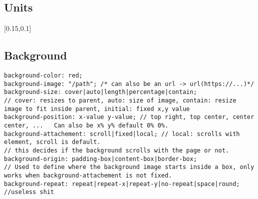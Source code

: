 \documentclass[main.tex,fontsize=6pt,paper=a4,paper=landscape,DIV=calc,]{scrartcl}
\begin{document}
\begin{multicols*}{4}
\subsection{Units}
[0.15,0.1]

\subsection{Background}
\vspace{-2mm}
\begin{lstlisting}
background-color: red;
background-image: "/path"; /* can also be an url -> url(https://...)*/
background-size: cover|auto|length|percentage|contain;
// cover: resizes to parent, auto: size of image, contain: resize image to fit inside parent, initial: fixed x,y value
background-position: x-value y-value; // top right, top center, center center, ...   Can also be x% y% default 0% 0%.
background-attachement: scroll|fixed|local; // local: scrolls with element, scroll is default.
// this decides if the background scrolls with the page or not.
background-origin: padding-box|content-box|border-box; 
// Used to define where the background image starts inside a box, only works when background-attachement is not fixed.
background-repeat: repeat|repeat-x|repeat-y|no-repeat|space|round; //useless shit
\end{lstlisting}
\vspace{2mm}


\end{multicols*}
\end{document}
